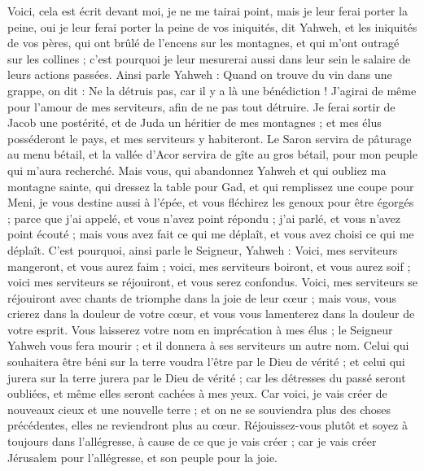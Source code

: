 \begin{multicols}{2}
Voici, cela est écrit devant moi, je ne me tairai point, mais je leur ferai porter la peine, oui je leur ferai porter la peine
de vos iniquités, dit Yahweh, et les iniquités de vos pères, qui ont brûlé de l'encens sur les montagnes, et qui m'ont outragé sur les collines ; c'est pourquoi je leur mesurerai aussi dans leur sein le salaire de leurs actions passées.
Ainsi parle Yahweh : Quand on trouve du vin dans une grappe, on dit : Ne la détruis pas, car il y a là une bénédiction ! J'agirai de même pour l'amour de mes serviteurs, afin de ne pas tout détruire.
Je ferai sortir de Jacob une postérité, et de Juda un héritier de mes montagnes ; et mes élus posséderont le pays, et mes serviteurs y habiteront.
Le Saron servira de pâturage au menu bétail, et la vallée d'Acor servira de gîte au gros bétail, pour mon peuple qui m'aura recherché.
Mais vous, qui abandonnez Yahweh et qui oubliez ma montagne sainte, qui dressez la table pour Gad, et qui remplissez une coupe pour Meni,
je vous destine aussi à l'épée, et vous fléchirez les genoux pour être égorgés ; parce que j'ai appelé, et vous n'avez point répondu ; j'ai parlé, et vous n'avez point écouté ; mais vous avez fait ce qui me déplaît, et vous avez choisi ce qui me déplaît.
C'est pourquoi, ainsi parle le Seigneur, Yahweh : Voici, mes serviteurs mangeront, et vous aurez faim ; voici, mes serviteurs boiront, et vous aurez soif ; voici mes serviteurs se réjouiront, et vous serez confondus.
Voici, mes serviteurs se réjouiront avec chants de triomphe dans la joie de leur cœur ; mais vous, vous crierez dans la douleur de votre cœur, et vous vous lamenterez dans la douleur de votre esprit.
Vous laisserez votre nom en imprécation à mes élus ; le Seigneur Yahweh vous fera mourir ; et il donnera à ses serviteurs un autre nom.
Celui qui souhaitera être béni sur la terre voudra l'être par le Dieu de vérité ; et celui qui jurera sur la terre jurera par le Dieu de vérité ; car les détresses du passé seront oubliées, et même elles seront cachées à mes yeux.
Car voici, je vais créer de nouveaux cieux et une nouvelle terre ; et on ne se souviendra plus des choses précédentes, elles ne reviendront plus au cœur.
Réjouissez-vous plutôt et soyez à toujours dans l'allégresse, à cause de ce que je vais créer ; car je vais créer Jérusalem pour l'allégresse, et son peuple pour la joie.

\end{multicols}
